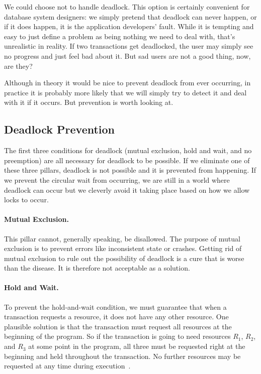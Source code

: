 We could choose not to handle deadlock. This option is certainly convenient for database system designers: we simply pretend that deadlock can never happen, or if it does happen, it is the application developers' fault. While it is tempting and easy to just define a problem as being nothing we need to deal with, that's unrealistic in reality. If two transactions get deadlocked, the user may simply see no progress and just feel bad about it. But sad users are not a good thing, now, are they?

Although in theory it would be nice to prevent deadlock from ever occurring, in practice it is probably more likely that we will simply try to detect it and deal with it if it occurs. But prevention is worth looking at.

\subsection*{Deadlock Prevention}

 The first three conditions for deadlock (mutual exclusion, hold and wait, and no preemption) are all necessary for deadlock to be possible. If we eliminate one of these three pillars, deadlock is not possible and it is prevented from happening. If we prevent the circular wait from occurring, we are still in a world where deadlock can occur but we cleverly avoid it taking place based on how we allow locks to occur.

\paragraph{Mutual Exclusion.} This pillar cannot, generally speaking, be disallowed. The purpose of  mutual exclusion is to prevent errors like inconsistent state or crashes. Getting rid of mutual exclusion to rule out the possibility of deadlock is a cure that is worse than the disease. It is therefore not acceptable as a solution.

\paragraph{Hold and Wait.} To prevent the hold-and-wait condition, we must guarantee that when a transaction requests a resource, it does not have any other resource. One plausible solution is that the transaction must request all resources at the beginning of the program. So if the transaction is going to need resources $R_{1}$, $R_{2}$, and $R_{3}$ at some point in the program, all three must be requested right at the beginning and held throughout the transaction. No further resources may be requested at any time during execution~\cite{osc}.

